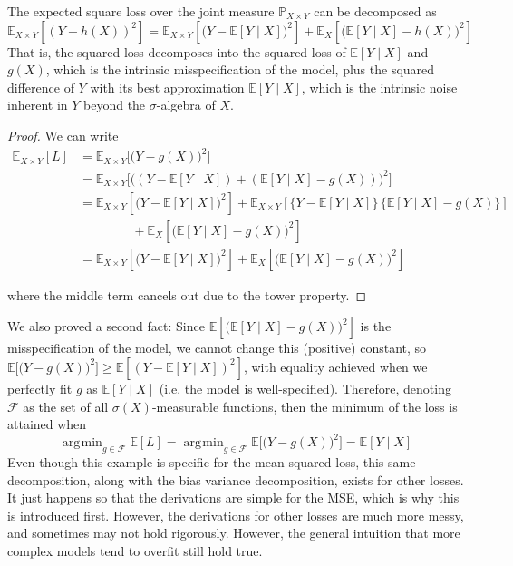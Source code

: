 \documentclass{article}
\DeclareMathOperator*{\argmin}{\arg\!\min}
\begin{document}
      \begin{theorem}
        The expected square loss over the joint measure $\mathbb{P}_{X \times Y}$ can be decomposed as 
        \begin{equation}
          \mathbb{E}_{X \times Y} [( Y - h(X))^2] = \mathbb{E}_{X \times Y} [\big(Y - \mathbb{E}[Y \mid X]\big)^2] + \mathbb{E}_X [\big(\mathbb{E}[Y \mid X] - h(X) \big)^2]
        \end{equation}
        That is, the squared loss decomposes into the squared loss of $\mathbb{E}[Y \mid X]$ and $g(X)$, which is the intrinsic misspecification of the model, plus the squared difference of $Y$ with its best approximation $\mathbb{E}[Y\mid X]$, which is the intrinsic noise inherent in $Y$ beyond the $\sigma$-algebra of $X$. 
      \end{theorem}
      \begin{proof}
        We can write 
        \begin{align*}
          \mathbb{E}_{X \times Y} [L] & = \mathbb{E}_{X \times Y} \big[ \big(Y - g(X)\big)^2 \big] \\
          & = \mathbb{E}_{X \times Y}\big[ \big((Y - \mathbb{E}[Y \mid X]) + (\mathbb{E}[Y \mid X] - g(X)) \big)^2 \big] \\
          & = \mathbb{E}_{X \times Y} [\big(Y - \mathbb{E}[Y \mid X]\big)^2] + \mathbb{E}_{X \times Y} [\{Y - \mathbb{E} [Y \mid X]\} \, \{ \mathbb{E}[Y \mid X] - g(X) \}] \\
          & \;\;\;\;\;\;\;\;\;\;\;\;\;\;\; + \mathbb{E}_X [\big(\mathbb{E}[Y \mid X] - g(X) \big)^2] \\
          & = \mathbb{E}_{X \times Y} [\big(Y - \mathbb{E}[Y \mid X]\big)^2] + \mathbb{E}_X [\big(\mathbb{E}[Y \mid X] - g(X) \big)^2]
        \end{align*}

        where the middle term cancels out due to the tower property. 
      \end{proof}

      We also proved a second fact: Since $\mathbb{E}[\big(\mathbb{E}[Y \mid X] - g(X) \big)^2]$ is the misspecification of the model, we cannot change this (positive) constant, so $\mathbb{E}\big[ \big(Y - g(X)\big)^2 \big] \geq \mathbb{E}[(Y - \mathbb{E}[Y \mid X])^2]$, with equality achieved when we perfectly fit $g$ as $\mathbb{E}[Y \mid X]$ (i.e. the model is well-specified). Therefore, denoting $\mathcal{F}$ as the set of all $\sigma(X)$-measurable functions, then the minimum of the loss is attained when 
      \begin{equation}
        \argmin_{g \in \mathcal{F}} \mathbb{E}[L] = \argmin_{g \in \mathcal{F}} \mathbb{E} \big[ \big(Y - g(X)\big)^2 \big] = \mathbb{E}[Y \mid X]
      \end{equation}
      Even though this example is specific for the mean squared loss, this same decomposition, along with the bias variance decomposition, exists for other losses. It just happens so that the derivations are simple for the MSE, which is why this is introduced first. However, the derivations for other losses are much more messy, and sometimes may not hold rigorously. However, the general intuition that more complex models tend to overfit still hold true. 
\end{document}
